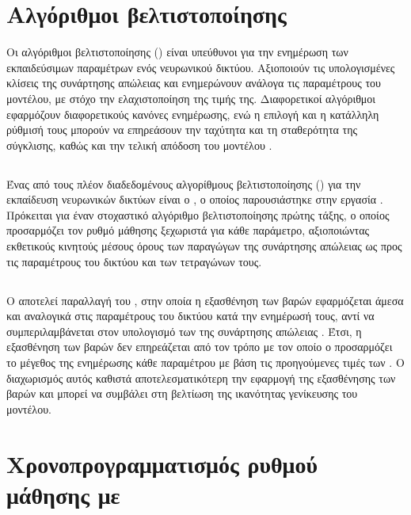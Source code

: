 \section{Αλγόριθμοι βελτιστοποίησης}
\label{subsec:optimizers}

Οι αλγόριθμοι βελτιστοποίησης () είναι υπεύθυνοι για την
ενημέρωση των εκπαιδεύσιμων παραμέτρων ενός νευρωνικού δικτύου. 
Αξιοποιούν τις υπολογισμένες κλίσεις  της συνάρτησης απώλειας και
ενημερώνουν ανάλογα τις παραμέτρους του μοντέλου, με στόχο την
ελαχιστοποίηση της τιμής της. Διαφορετικοί αλγόριθμοι εφαρμόζουν
διαφορετικούς κανόνες ενημέρωσης, ενώ η επιλογή και η κατάλληλη ρύθμισή
τους μπορούν να επηρεάσουν την ταχύτητα και τη σταθερότητα της σύγκλισης,
καθώς και την τελική απόδοση του μοντέλου
\cite{choi2020empirical}.

\subsection{}
\label{subsec:Adam}
Ένας από τους πλέον διαδεδομένους αλγορίθμους βελτιστοποίησης () για την
εκπαίδευση νευρωνικών δικτύων είναι ο , ο οποίος παρουσιάστηκε
στην εργασία \cite{kingma2015adam}. Πρόκειται για έναν
στοχαστικό αλγόριθμο βελτιστοποίησης πρώτης τάξης, ο οποίος προσαρμόζει τον ρυθμό μάθησης ξεχωριστά για κάθε παράμετρο,
αξιοποιώντας εκθετικούς κινητούς μέσους όρους των παραγώγων της
συνάρτησης απώλειας ως προς τις παραμέτρους του δικτύου και των
τετραγώνων τους.

\subsection{}
\label{subsec:AdamW}
Ο  αποτελεί παραλλαγή του , στην οποία η εξασθένηση
των βαρών εφαρμόζεται άμεσα και αναλογικά στις
παραμέτρους του δικτύου κατά την ενημέρωσή τους, αντί να συμπεριλαμβάνεται
στον υπολογισμό των  της συνάρτησης απώλειας
\cite{loshchilov2019decoupled}. Έτσι, η εξασθένηση των βαρών δεν επηρεάζεται από τον τρόπο με τον οποίο
ο  προσαρμόζει το μέγεθος της ενημέρωσης κάθε παραμέτρου με βάση
τις προηγούμενες τιμές των . Ο διαχωρισμός αυτός καθιστά
αποτελεσματικότερη την εφαρμογή της εξασθένησης των βαρών και μπορεί να
συμβάλει στη βελτίωση της ικανότητας γενίκευσης του μοντέλου.

\section{Χρονοπρογραμματισμός ρυθμού μάθησης με }
\label{subsec:learning-rate-scheduling}

